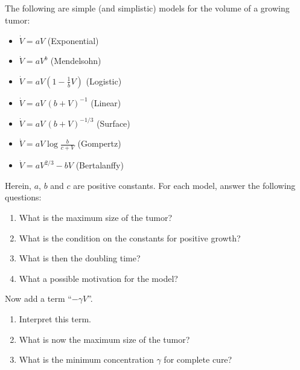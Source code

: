 \documentclass[12pt,a4paper]{article}
\begin{document}
    
    \subsection{}
    
    The following are simple (and simplistic) models for 
    the volume of a growing tumor:
    \begin{itemize}
    \item 
        $\dot{V} = a V$
        \hfill
        (Exponential)
    \item
        $\dot{V} = a V^b$
        \hfill
        (Mendelsohn)
    \item
        $\dot{V} = a V (1 - \frac1b V)$
        \hfill
        (Logistic)
    \item
        $\dot{V} = a V \, (b + V)^{-1}$
        \hfill
        (Linear)
    \item
        $\dot{V} = a V \, (b + V)^{-1/3}$
        \hfill
        (Surface)
    \item
        $\dot{V} = a V \log \frac{b}{c + V}$
        \hfill
        (Gompertz)
    \item
        $\dot{V} = a V^{2/3} - b V$
        \hfill
        (Bertalanffy)
    \end{itemize}
    Herein, $a$, $b$ and $c$ are positive constants.
    For each model, answer the following questions:
    \begin{enumerate}
    \item 
        What is the maximum size of the tumor?
    \item
        What is the condition on the constants for positive growth?
    \item
        What is then the doubling time?
    \item
        What a possible motivation for the model?
    \end{enumerate}
    
    
    Now add a term ``$-\gamma V$''.
    \begin{enumerate}[resume]
    \item
        Interpret this term.
    \item
        What is now the maximum size of the tumor?
    \item
        What is the minimum concentration $\gamma$ for complete cure?
    \end{enumerate}
    
\end{document}
